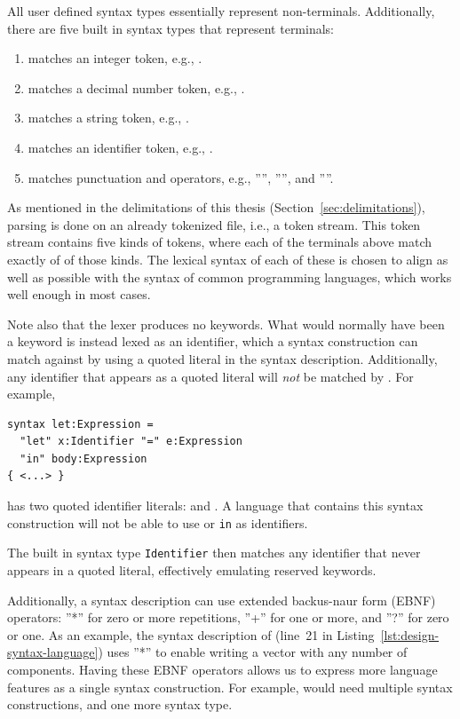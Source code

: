 \documentclass{kththesis}
\begin{document}
All user defined syntax types essentially represent non-terminals. Additionally, there are five built in syntax types that represent terminals:

\begin{enumerate}
  \item {} matches an integer token, e.g., .
  \item {} matches a decimal number token, e.g., .
  \item {} matches a string token, e.g., .
  \item {} matches an identifier token, e.g., .
  \item {} matches punctuation and operators, e.g., ''\syncon{(}'', ''\syncon{+}'', and ''\syncon{!=}''.
\end{enumerate}

As mentioned in the delimitations of this thesis (Section~\ref{sec:delimitations}), parsing is done on an already tokenized file, i.e., a token stream. This token stream contains five kinds of tokens, where each of the terminals above match exactly of of those kinds. The lexical syntax of each of these is chosen to align as well as possible with the syntax of common programming languages, which works well enough in most cases.

Note also that the lexer produces no keywords. What would normally have been a keyword is instead lexed as an identifier, which a syntax construction can match against by using a quoted literal in the syntax description. Additionally, any identifier that appears as a quoted literal will \emph{not} be matched by . For example,

\begin{verbatim}
syntax let:Expression =
  "let" x:Identifier "=" e:Expression
  "in" body:Expression
{ <...> }
\end{verbatim}

has two quoted identifier literals:  and . A language that contains this syntax construction will not be able to use  or \texttt{in} as identifiers.

The built in syntax type \texttt{Identifier} then matches any identifier that never appears in a quoted literal, effectively emulating reserved keywords.

Additionally, a syntax description can use extended backus-naur form (EBNF) operators: ''*'' for zero or more repetitions, ''+'' for one or more, and ''?'' for zero or one. As an example, the syntax description of  (line~21 in Listing~\ref{lst:design-syntax-language}) uses ''*'' to enable writing a vector with any number of components. Having these EBNF operators allows us to express more language features as a single syntax construction. For example,  would need multiple syntax constructions, and one more syntax type.
\end{document}
